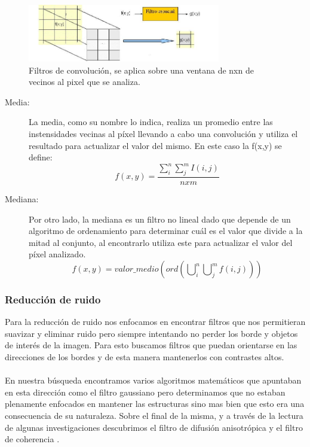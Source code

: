 \begin{figure}[H]
	\centering
  \includegraphics[width=0.75\textwidth]{./Figures/kernel.jpg}
  \caption{Filtros de convoluci\'on, se aplica sobre una ventana de nxn de vecinos al pixel que se analiza.}
  \label{fig:centeredregionthermal}
\end{figure}

\begin{description}
  \item[Media:] La media, como su nombre lo indica, realiza un promedio entre las instensidades vecinas al p\'ixel llevando a cabo una convoluci\'on y utiliza el resultado para actualizar el valor del mismo. En este caso la f(x,y) se define:
  \begin{displaymath}
  	f(x,y)=\frac{\sum_i^n\sum_j^mI(i,j)}{nxm}
  \end{displaymath}
  \item[Mediana:] Por otro lado, la mediana es un filtro no lineal dado que depende de un algoritmo de ordenamiento para determinar cu\'al es el valor que divide a la mitad al conjunto, al encontrarlo utiliza este para actualizar el valor del p\'ixel analizado.
  \begin{displaymath}
  	f(x,y)=valor\_medio(ord(\bigcup\nolimits_i^n\bigcup\nolimits_j^mf(i,j)))
  \end{displaymath}
\end{description}

\subsubsection{Reducci\'on de ruido}

Para la reducci\'on de ruido nos enfocamos en encontrar filtros que nos permitieran suavizar y eliminar ruido pero siempre intentando no perder los borde y objetos de inter\'es de la imagen. Para esto buscamos filtros que puedan orientarse en las direcciones de los bordes y de esta manera mantenerlos con contrastes altos.
\paragraph{}
En nuestra b\'usqueda encontramos varios algoritmos matem\'aticos que apuntaban en esta direcci\'on como el filtro gaussiano pero determinamos que no estaban plenamente enfocados en mantener las estructuras sino mas bien que esto era una consecuencia de su naturaleza. Sobre el final de la misma, y a trav\'es de la lectura de algunas investigaciones descubrimos el filtro de difusi\'on anisotr\'opica \cite{perona1990scale} y el filtro de coherencia \cite{weickert1999coherence}.


